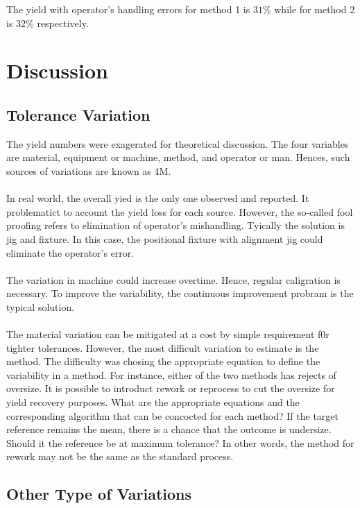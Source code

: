 \documentclass[10pt,journal,compsoc]{IEEEtran} \ifCLASSOPTIONcompsoc
\begin{document}
\noindent The yield with operator's handling errors for method 1 is $31 $\% while for method 2 is $32 $\% respectively.
\noindent \section{Discussion}\subsection{Tolerance Variation}The yield numbers were exagerated for theoretical discussion. The four    variables are material, equipment or machine, method, and operator or man.    Hences, such sources of variations are known as 4M. \\ \\    In real world, the overall yied is the only one observed and reported. It    problematict to account the yield loss for each source. However, the so-called    fool proofing refers to elimination of operator's mishandling. Tyically the    solution is jig and fixture. In this case, the positional fixture with    alignment jig could eliminate the operator's error. \\ \\    The variation in machine could increase overtime. Hence, regular caligration    is necessary. To improve the variability, the continuous improvement    probram is the typical solution. \\ \\    The material variation can be mitigated at a cost by simple requirement f0r    tighter tolerances. However, the most difficult variation to estimate is    the method. The difficulty was chosing the appropriate equation to define    the variability in a method. For instance, either of the two methods has    rejects of oversize.  It is possible to introduct rework or reprocess to    cut the oversize for yield recovery purposes. What are the appropriate    equations and the corresponding algorithm that can be concocted for each    method? If the target reference remains the mean, there is a chance that the    outcome is undersize. Should it the reference be at maximum tolerance?    In other words, the method for rework may not be the same as the standard    process. \subsection{Other Type of Variations}
\end{document}
